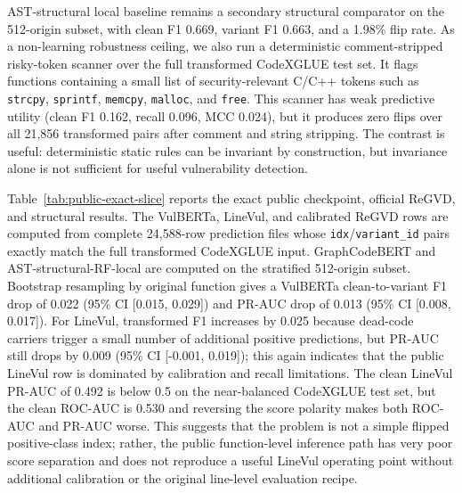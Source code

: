 \documentclass[a4paper,fleqn]{cas-dc}
\begin{document}
AST-structural local baseline remains a secondary structural comparator on the
512-origin subset, with clean F1 0.669, variant F1 0.663, and a 1.98\% flip
rate.
As a non-learning robustness ceiling, we also run a deterministic
comment-stripped risky-token scanner over the full transformed CodeXGLUE test
set. It flags functions containing a small list of security-relevant C/C++
tokens such as \texttt{strcpy}, \texttt{sprintf}, \texttt{memcpy},
\texttt{malloc}, and \texttt{free}. This scanner has weak predictive utility
(clean F1 0.162, recall 0.096, MCC 0.024), but it produces zero flips over all
21,856 transformed pairs after comment and string stripping. The contrast is
useful: deterministic static rules can be invariant by construction, but
invariance alone is not sufficient for useful vulnerability detection.

Table~\ref{tab:public-exact-slice} reports the exact public checkpoint,
official ReGVD, and structural results. The VulBERTa, LineVul, and calibrated
ReGVD rows are computed from complete 24,588-row prediction files whose
\texttt{idx}/\texttt{variant\_id} pairs exactly match the full transformed
CodeXGLUE input. GraphCodeBERT and AST-structural-RF-local are computed on the
stratified 512-origin subset.
Bootstrap resampling by original function gives a VulBERTa clean-to-variant
F1 drop of 0.022 (95\% CI [0.015, 0.029]) and PR-AUC drop of 0.013 (95\% CI
[0.008, 0.017]). For LineVul, transformed F1 increases by 0.025 because
dead-code carriers trigger a small number of additional positive predictions,
but PR-AUC still drops by 0.009 (95\% CI [-0.001, 0.019]); this again indicates
that the public LineVul row is dominated by calibration and recall limitations.
The clean LineVul PR-AUC of 0.492 is below 0.5 on the near-balanced CodeXGLUE
test set, but the clean ROC-AUC is 0.530 and reversing the score polarity makes
both ROC-AUC and PR-AUC worse. This suggests that the problem is not a simple
flipped positive-class index; rather, the public function-level inference path
has very poor score separation and does not reproduce a useful LineVul
operating point without additional calibration or the original line-level
evaluation recipe.
\end{document}
